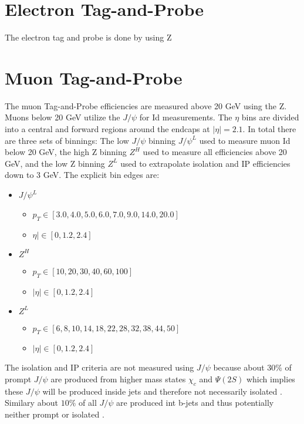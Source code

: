 \section{Electron Tag-and-Probe }

The electron tag and probe is done by using Z

\section{Muon Tag-and-Probe}

The muon Tag-and-Probe efficiencies are measured above 20 GeV using the Z. Muons below 20 GeV utilize the $J/\psi$ for Id measurements. The $\eta$ bins are divided into a central and forward regions around the endcaps at $|\eta| = 2.1$. In total there are three sets of binnings: The low \pt $J/\psi$ binning $J/\psi^{L}$ used to measure muon Id below 20 GeV, the high \pt Z binning $Z^{H}$ used to measure all efficiencies above 20 GeV, and the low \pt Z binning $Z^{L}$ used to extrapolate isolation and IP efficiencies down to 3 GeV.
The explicit bin edges are:
\begin{itemize}
\item $J/\psi^{L}$  
	\begin{itemize}
		\item[] $p_T \in [3.0, 4.0,  5.0, 6.0, 7.0, 9.0, 14.0,  20.0]$
		\item[]  $\eta| \in [0, 1.2, 2.4]$
	\end{itemize}
\item $Z^{H}$
	\begin{itemize}
		\item[] $ p_T \in [10, 20, 30, 40, 60, 100]$
		\item[] $|\eta| \in [ 0, 1.2, 2.4]$
	\end{itemize}
\item $Z^{L}$
	\begin{itemize}
		\item[] $ p_T \in [6,8,10,14,18,22,28,32,38,44,50]$ 
		\item[] $|\eta| \in [0, 1.2, 2.4]$
	\end{itemize}
\end{itemize}

The isolation and IP criteria are not measured using $J/\psi$ because about $30\%$ of prompt $J/\psi$ are produced from higher mass states $\chi_c$ and $\Psi(2S)$  which implies these $J/\psi$ will be produced inside jets and therefore not necessarily isolated \cite{Lansberg:2006dh}. Similary about $10\%$ of all $J/\psi$ are produced int b-jets and thus potentially neither prompt or isolated \cite{LHCb:2013itw}.

